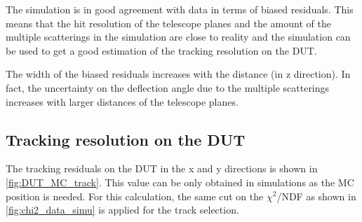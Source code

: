 The simulation is in good agreement with data in terms of biased
residuals. This means that the hit resolution of the telescope planes
and the amount of the multiple scatterings in the simulation are close
to reality and the simulation can be used to get a good estimation of
the tracking resolution on the DUT.

The width of the biased residuals increases with the distance (in z
direction). In fact, the uncertainty on the deflection angle due to
the multiple scatterings increases with larger distances of the
telescope planes.



\subsection{Tracking resolution on the DUT}
The tracking residuals on the DUT in the x and y directions is shown
in \cref{fig:DUT_MC_track}. This value can be only obtained in
simulations as the MC position is needed. For this calculation, the
same cut on the $\chi^2$/NDF as shown in \cref{fig:chi2_data_simu} is
applied for the track selection.

